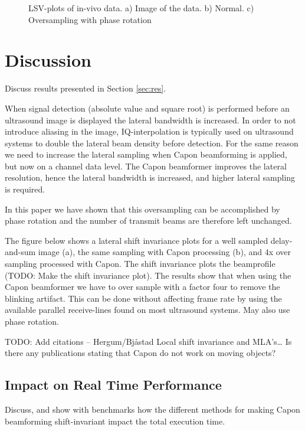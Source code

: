 \documentclass[journal]{IEEEtran}
\newcommand{\img}{img/}
\begin{document}
\begin{figure*}[!t]
\centerline{
\hfill{}
\hfill{}
}
\caption{LSV-plots of in-vivo data. a) Image of the data. b) Normal. c) Oversampling with phase rotation}
\label{fig:das}
\end{figure*}

\section{Discussion}\label{sec:dis}
Discuss results presented in Section \ref{sec:res}.

When signal detection (absolute value and square root) is performed before an ultrasound image is displayed the lateral bandwidth is increased. In order to not introduce aliasing in the image, IQ-interpolation is typically used on ultrasound systems to double the lateral beam density before detection. For the same reason we need to increase the lateral sampling when Capon beamforming is applied, but now on a channel data level. The Capon beamformer improves the lateral resolution, hence the lateral bandwidth is increased, and higher lateral sampling is required. 

In this paper we have shown that this oversampling can be accomplished by phase rotation and the number of transmit beams are therefore left unchanged. 

The figure below shows a lateral shift invariance plots for a well sampled delay-and-sum image (a), the same sampling with Capon processing (b), and 4x over sampling processed with Capon. The shift invariance plots the beamprofile (TODO: Make the shift invariance plot). The results show that when using the Capon beamformer we have to over sample with a factor four to remove the blinking artifact. This can be done without affecting frame rate by using the available parallel receive-lines found on most ultrasound systems. May also use phase rotation. 

TODO: Add citations – Hergum/Bjåstad Local shift invariance and MLA’s… Is there any publications stating that Capon do not work on moving objects?

\subsection{Impact on Real Time Performance}
Discuss, and show with benchmarks how the different methods for making Capon beamforming shift-invariant impact the total execution time.
\end{document}

